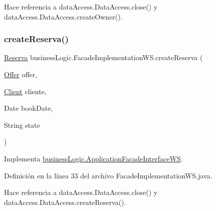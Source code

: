 Hace referencia a data\+Access.\+Data\+Access.\+close() y data\+Access.\+Data\+Access.\+create\+Owner().

\mbox{\label{classbusiness_logic_1_1_facade_implementation_w_s_a5bbdf1cf4235a84736744f3516ec1dae}} 
\subsubsection{\texorpdfstring{createReserva()}{createReserva()}}
{\footnotesize\ttfamily \mbox{\hyperlink{classdomain_1_1_reserva}{Reserva}} business\+Logic.\+Facade\+Implementation\+W\+S.\+create\+Reserva (\begin{DoxyParamCaption}\item[{\mbox{\hyperlink{classdomain_1_1_offer}{Offer}}}]{offer,  }\item[{\mbox{\hyperlink{classdomain_1_1_client}{Client}}}]{cliente,  }\item[{Date}]{book\+Date,  }\item[{String}]{state }\end{DoxyParamCaption})}



Implementa \mbox{\hyperlink{interfacebusiness_logic_1_1_application_facade_interface_w_s_ad807cbd5d877e941edc274563e5cefa3}{business\+Logic.\+Application\+Facade\+Interface\+WS}}.



Definición en la línea 33 del archivo Facade\+Implementation\+W\+S.\+java.


\begin{DoxyCode}{0}

\end{DoxyCode}


Hace referencia a data\+Access.\+Data\+Access.\+close() y data\+Access.\+Data\+Access.\+create\+Reserva().

\mbox{\label{classbusiness_logic_1_1_facade_implementation_w_s_a2df596d357c02b4aef6711526347c951}} 
